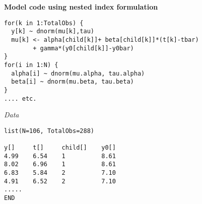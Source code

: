 \documentclass[handout]{beamer}
\begin{document}
\begin{frame}[fragile]
{\bf Model code using nested index formulation}
\begin{footnotesize}\begin{verbatim}
for(k in 1:TotalObs) {
  y[k] ~ dnorm(mu[k],tau)
  mu[k] <- alpha[child[k]]+ beta[child[k]]*(t[k]-tbar)
        + gamma*(y0[child[k]]-y0bar)
}
for(i in 1:N) {
  alpha[i] ~ dnorm(mu.alpha, tau.alpha)
  beta[i] ~ dnorm(mu.beta, tau.beta)
}
.... etc.
\end{verbatim}\end{footnotesize}

{\it Data}
\begin{footnotesize}\begin{verbatim}
list(N=106, TotalObs=288)

y[]     t[]     child[]    y0[]
4.99    6.54    1          8.61
8.02    6.96    1          8.61
6.83    5.84    2          7.10
4.91    6.52    2          7.10
.....
END
\end{verbatim}\end{footnotesize}
\end{frame}
\end{document}
